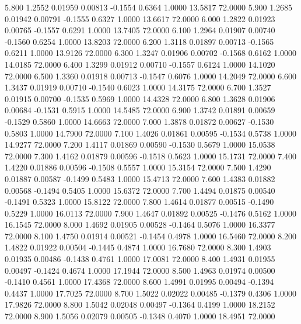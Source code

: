    5.800   1.2552   0.01959   0.00813  -0.1554   0.6364   1.0000  13.5817  72.0000
   5.900   1.2685   0.01942   0.00791  -0.1555   0.6327   1.0000  13.6617  72.0000
   6.000   1.2822   0.01923   0.00765  -0.1557   0.6291   1.0000  13.7405  72.0000
   6.100   1.2964   0.01907   0.00740  -0.1560   0.6254   1.0000  13.8203  72.0000
   6.200   1.3118   0.01897   0.00713  -0.1565   0.6211   1.0000  13.9126  72.0000
   6.300   1.3247   0.01906   0.00702  -0.1568   0.6162   1.0000  14.0185  72.0000
   6.400   1.3299   0.01912   0.00710  -0.1557   0.6124   1.0000  14.1020  72.0000
   6.500   1.3360   0.01918   0.00713  -0.1547   0.6076   1.0000  14.2049  72.0000
   6.600   1.3437   0.01919   0.00710  -0.1540   0.6023   1.0000  14.3175  72.0000
   6.700   1.3527   0.01915   0.00700  -0.1535   0.5969   1.0000  14.4328  72.0000
   6.800   1.3628   0.01906   0.00684  -0.1531   0.5915   1.0000  14.5485  72.0000
   6.900   1.3742   0.01891   0.00659  -0.1529   0.5860   1.0000  14.6663  72.0000
   7.000   1.3878   0.01872   0.00627  -0.1530   0.5803   1.0000  14.7900  72.0000
   7.100   1.4026   0.01861   0.00595  -0.1534   0.5738   1.0000  14.9277  72.0000
   7.200   1.4117   0.01869   0.00590  -0.1530   0.5679   1.0000  15.0538  72.0000
   7.300   1.4162   0.01879   0.00596  -0.1518   0.5623   1.0000  15.1731  72.0000
   7.400   1.4220   0.01886   0.00596  -0.1508   0.5557   1.0000  15.3154  72.0000
   7.500   1.4290   0.01887   0.00587  -0.1499   0.5483   1.0000  15.4713  72.0000
   7.600   1.4383   0.01882   0.00568  -0.1494   0.5405   1.0000  15.6372  72.0000
   7.700   1.4494   0.01875   0.00540  -0.1491   0.5323   1.0000  15.8122  72.0000
   7.800   1.4614   0.01877   0.00515  -0.1490   0.5229   1.0000  16.0113  72.0000
   7.900   1.4647   0.01892   0.00525  -0.1476   0.5162   1.0000  16.1545  72.0000
   8.000   1.4692   0.01905   0.00528  -0.1464   0.5076   1.0000  16.3377  72.0000
   8.100   1.4750   0.01914   0.00521  -0.1454   0.4978   1.0000  16.5460  72.0000
   8.200   1.4822   0.01922   0.00504  -0.1445   0.4874   1.0000  16.7680  72.0000
   8.300   1.4903   0.01935   0.00486  -0.1438   0.4761   1.0000  17.0081  72.0000
   8.400   1.4931   0.01955   0.00497  -0.1424   0.4674   1.0000  17.1944  72.0000
   8.500   1.4963   0.01974   0.00500  -0.1410   0.4561   1.0000  17.4368  72.0000
   8.600   1.4991   0.01995   0.00494  -0.1394   0.4437   1.0000  17.7025  72.0000
   8.700   1.5022   0.02022   0.00485  -0.1379   0.4306   1.0000  17.9826  72.0000
   8.800   1.5042   0.02048   0.00497  -0.1364   0.4199   1.0000  18.2152  72.0000
   8.900   1.5056   0.02079   0.00505  -0.1348   0.4070   1.0000  18.4951  72.0000
